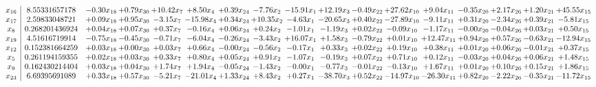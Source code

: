 \documentclass[9pt]{article}
\begin{document}
 \[\begin{array}{c| c c@{\hskip 2pt} c@{\hskip 2pt} c@{\hskip 2pt} c@{\hskip 2pt} c@{\hskip 2pt} c@{\hskip 2pt} c@{\hskip 2pt} c@{\hskip 2pt} c@{\hskip 2pt} c@{\hskip 2pt} c@{\hskip 2pt} c@{\hskip 2pt} c@{\hskip 2pt} c@{\hskip 2pt} c@{\hskip 2pt} }
 x_{16}   &  8.55331657178 & -0.30 x_{18} & +  0.79 x_{30} & + 10.42 x_{7} & +  8.50 x_{4} & +  0.39 x_{24} & -7.76 x_{2} & -15.91 x_{1} & + 12.19 x_{3} & -0.49 x_{22} & + 27.62 x_{10} & +  9.04 x_{11} & -0.35 x_{20} & +  2.17 x_{26} & +  1.20 x_{21} & + 45.55 x_{15}\\
 x_{17}   &  2.59833048721 & +  0.09 x_{18} & +  0.95 x_{30} & -3.15 x_{7} & -15.98 x_{4} & +  0.34 x_{24} & + 10.35 x_{2} & -4.63 x_{1} & -20.65 x_{3} & +  0.40 x_{22} & -27.89 x_{10} & -9.11 x_{11} & +  0.31 x_{20} & -2.34 x_{26} & +  0.39 x_{21} & -5.81 x_{15}\\
 x_{8}   &  0.268201436924 & +  0.04 x_{18} & +  0.07 x_{30} & +  0.37 x_{7} & -0.16 x_{4} & +  0.06 x_{24} & +  0.24 x_{2} & -1.01 x_{1} & -1.19 x_{3} & +  0.02 x_{22} & -0.09 x_{10} & -1.17 x_{11} & -0.00 x_{20} & -0.04 x_{26} & +  0.03 x_{21} & +  0.50 x_{15}\\
 x_{19}   &  4.51616719914 & -0.75 x_{18} & -0.45 x_{30} & -0.71 x_{7} & -6.04 x_{4} & -0.26 x_{24} & -3.43 x_{2} & + 16.07 x_{1} & +  1.58 x_{3} & -0.79 x_{22} & +  0.01 x_{10} & + 12.47 x_{11} & +  0.94 x_{20} & +  0.57 x_{26} & -0.63 x_{21} & -12.94 x_{15}\\
 x_{12}   &  0.152381664259 & +  0.03 x_{18} & +  0.00 x_{30} & +  0.03 x_{7} & +  0.66 x_{4} & -0.00 x_{24} & -0.56 x_{2} & -0.17 x_{1} & +  0.33 x_{3} & +  0.02 x_{22} & +  0.19 x_{10} & +  0.38 x_{11} & +  0.01 x_{20} & +  0.06 x_{26} & -0.01 x_{21} & +  0.37 x_{15}\\
 x_{5}   &  0.261194159355 & +  0.02 x_{18} & +  0.03 x_{30} & +  0.33 x_{7} & +  0.80 x_{4} & +  0.05 x_{24} & +  0.91 x_{2} & -1.07 x_{1} & -0.19 x_{3} & +  0.07 x_{22} & +  0.71 x_{10} & +  0.12 x_{11} & -0.03 x_{20} & +  0.04 x_{26} & +  0.06 x_{21} & +  1.48 x_{15}\\
 x_{9}   &  0.162430214404 & +  0.03 x_{18} & +  0.04 x_{30} & +  1.74 x_{7} & +  1.94 x_{4} & -0.05 x_{24} & -1.43 x_{2} & -0.00 x_{1} & -0.77 x_{3} & -0.01 x_{22} & -0.13 x_{10} & +  1.67 x_{11} & +  0.01 x_{20} & +  0.10 x_{26} & +  0.15 x_{21} & +  1.86 x_{15}\\
 x_{23}   &  6.69395691089 & +  0.33 x_{18} & +  0.57 x_{30} & -5.21 x_{7} & -21.01 x_{4} & +  1.33 x_{24} & +  8.43 x_{2} & +  0.27 x_{1} & -38.70 x_{3} & +  0.52 x_{22} & -14.97 x_{10} & -26.30 x_{11} & +  0.82 x_{20} & -2.22 x_{26} & -0.35 x_{21} & -11.72 x_{15}\\

\end{array}\]
\end{document}
